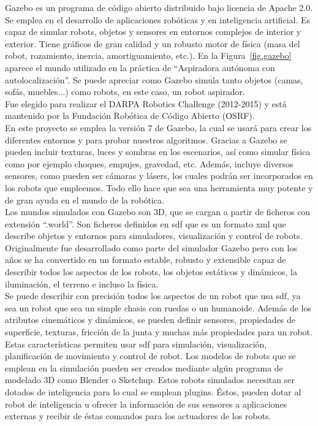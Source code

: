 Gazebo es un programa de código abierto distribuido bajo licencia de Apache 2.0. Se emplea en el desarrollo de aplicaciones robóticas y en inteligencia artificial. Es capaz de simular robots, objetos y sensores en entornos complejos de interior y exterior. Tiene gráficos de gran calidad y un robusto motor de física (masa del robot, rozamiento, inercia, amortiguamiento, etc.). En la Figura~\ref{fig.gazebo} aparece el mundo utilizado en la práctica de ``Aspiradora autónoma con autolocalización''. Se puede apreciar como Gazebo simula tanto objetos (camas, sofás, muebles...) como robots, en este caso, un robot aspirador. \\

Fue elegido para realizar el DARPA Robotics Challenge (2012-2015) y está mantenido por la Fundación Robótica de Código Abierto (OSRF). \\

En este proyecto se emplea la versión 7 de Gazebo, la cual se usará para crear los diferentes entornos y para probar nuestros algoritmos.  Gracias a Gazebo se pueden incluir texturas, luces y sombras en los escenarios, así como simular física como por ejemplo choques, empujes, gravedad, etc. Además, incluye diversos sensores, como pueden ser cámaras y lásers, los cuales podrán ser incorporados en los robots que empleemos. Todo ello hace que sea una herramienta muy potente y de gran ayuda en el mundo de la robótica.\\

Los mundos simulados con Gazebo son 3D, que se cargan a partir de ficheros con extensión ``.world''. Son ficheros definidos en \acrfull{sdf} que es un formato \acrshort{xml} que describe objetos y entornos para simuladores, visualización y control de robots. Originalmente fue desarrollado como parte del simulador Gazebo pero con los años se ha convertido en un formato estable, robusto y extensible capaz de describir todos los aspectos de los robots, los objetos estáticos y dinámicos, la iluminación, el terreno e incluso la física.\\

Se puede describir con precisión todos los aspectos de un robot que usa \acrshort{sdf}, ya sea un robot que sea un simple chasis con ruedas o un humanoide. Además de los atributos cinemáticos y dinámicos, se pueden definir sensores, propiedades de superficie, texturas, fricción de la junta y muchas más propiedades para un robot. Estas características permiten usar \acrshort{sdf} para simulación, visualización, planificación de movimiento y control de robot. Los modelos de robots que se emplean en la simulación pueden ser creados mediante algún programa de modelado 3D como Blender o Sketchup. Estos robots simulados necesitan ser dotados de inteligencia para lo cual se emplean plugins. Éstos, pueden dotar al robot de inteligencia u ofrecer la información de sus sensores a aplicaciones externas y recibir de éstas comandos para los actuadores de los robots.


